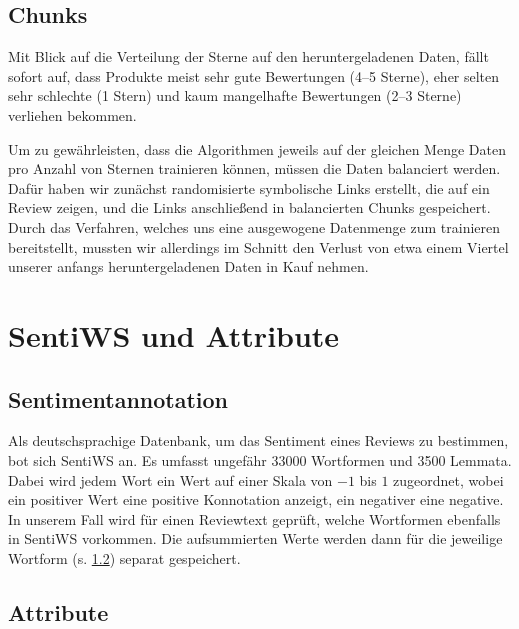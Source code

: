 \documentclass[a4paper]{article}
\begin{document}
\subsection{Chunks}

Mit Blick auf die Verteilung der Sterne auf den heruntergeladenen Daten, fällt sofort auf, dass Produkte meist sehr gute Bewertungen (4--5 Sterne), eher selten sehr schlechte (1 Stern) und kaum mangelhafte Bewertungen (2--3 Sterne) verliehen bekommen.

Um zu gewährleisten, dass die Algorithmen jeweils auf der gleichen Menge Daten pro Anzahl von Sternen trainieren können, müssen die Daten balanciert werden. 
Dafür haben wir zunächst randomisierte symbolische Links erstellt, die auf ein Review zeigen, und die Links anschließend in balancierten Chunks gespeichert. 
Durch das Verfahren, welches uns eine ausgewogene Datenmenge zum trainieren bereitstellt, mussten wir allerdings im Schnitt den Verlust von etwa einem Viertel unserer anfangs heruntergeladenen Daten in Kauf nehmen.


\section{SentiWS und Attribute}


\subsection{Sentimentannotation}

Als deutschsprachige Datenbank, um das Sentiment eines Reviews zu bestimmen, bot sich SentiWS an. Es umfasst ungefähr 33000 Wortformen und 3500 Lemmata.
Dabei wird jedem Wort ein Wert auf einer Skala von $-1$ bis $1$ zugeordnet, wobei ein positiver Wert eine positive Konnotation anzeigt, ein negativer eine negative.
In unserem Fall wird für einen Reviewtext geprüft, welche Wortformen ebenfalls in SentiWS vorkommen. Die aufsummierten Werte werden dann für die jeweilige Wortform (s. \ref{features}) separat gespeichert.


\subsection{Attribute}
\label{features}
\end{document}
